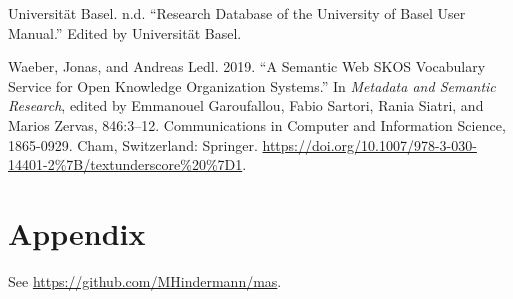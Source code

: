 \begin{CSLReferences}{1}{0}
\leavevmode\hypertarget{ref-UniversitatBasel.2021}{}%
Universität Basel. n.d. {``Research Database of the University of Basel
User Manual.''} Edited by Universität Basel.

\leavevmode\hypertarget{ref-Waeber.2019}{}%
Waeber, Jonas, and Andreas Ledl. 2019. {``A Semantic Web SKOS Vocabulary
Service for Open Knowledge Organization Systems.''} In \emph{Metadata
and Semantic Research}, edited by Emmanouel Garoufallou, Fabio Sartori,
Rania Siatri, and Marios Zervas, 846:3--12. Communications in Computer
and Information Science, 1865-0929. Cham, Switzerland: Springer.
\url{https://doi.org/10.1007/978-3-030-14401-2\%7B/textunderscore\%20\%7D1}.

\end{CSLReferences}

\hypertarget{appendix}{%
	\section{Appendix}\label{appendix}}

See \url{https://github.com/MHindermann/mas}.
